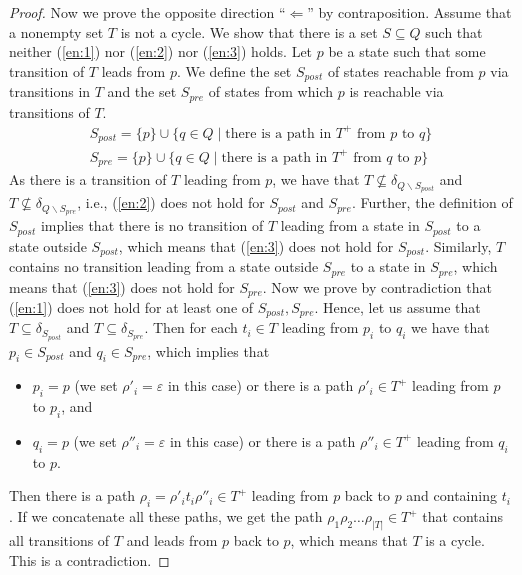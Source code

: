 \documentclass[a4paper,UKenglish,cleveref,autoref,thm-restate]{lipics-v2021}
\newcommand{\pre}{{S_\mathit{pre}}}
\newcommand{\post}{{S_\mathit{post}}}
\begin{document}
\begin{proof}
  Now we prove the opposite direction ``$\Longleftarrow$'' by
  contraposition. Assume that a nonempty set $T$ is not a cycle. We
  show that there is a set $S\subseteq Q$ such that neither
  (\ref{en:1}) nor (\ref{en:2}) nor (\ref{en:3}) holds. Let $p$ be a
  state such that some transition of $T$ leads from $p$. We define the
  set $\post$ of states reachable from $p$ via transitions in $T$ and the set
  $\pre$ of states from which $p$ is reachable via transitions of $T$.
  \[
    \begin{array}{r}
    \post=\{p\}\cup\{q\in Q\mid \textrm{there is a path in }T^+\textrm{ from }p\textrm{ to }q\}\\[.5ex]
    \pre=\{p\}\cup\{q\in Q\mid \textrm{there is a path in }T^+\textrm{ from }q\textrm{ to }p\}
    \end{array}
  \]  
  As there is a transition of $T$ leading from $p$, we have that
  $T\not\subseteq\delta_{Q\smallsetminus\post}$ and
  $T\not\subseteq\delta_{Q\smallsetminus\pre}$, i.e., (\ref{en:2})
  does not hold for $\post$ and $\pre$. Further, the definition of
  $\post$ implies that there is no transition of $T$ leading from a
  state in $\post$ to a state outside $\post$, which means that
  (\ref{en:3}) does not hold for $\post$. Similarly, $T$ contains no
  transition leading from a state outside $\pre$ to a state in $\pre$,
  which means that (\ref{en:3}) does not hold for $\pre$. Now we prove
  by contradiction that (\ref{en:1}) does not hold for at least one of
  $\post,\pre$. Hence, let us assume that $T\subseteq\delta_\post$ and
  $T\subseteq\delta_\pre$. Then for each $t_i\in T$ leading from $p_i$
  to $q_i$ we have that $p_i\in\post$ and $q_i\in\pre$, which implies
  that
  \begin{itemize}
  \item $p_i=p$ (we set $\rho'_i=\varepsilon$ in this case) or
    there is a path $\rho'_i\in T^+$ leading from $p$ to $p_i$, and
  \item $q_i=p$ (we set $\rho''_i=\varepsilon$ in this case) or
    there is a path $\rho''_i\in T^+$ leading from $q_i$ to $p$.
  \end{itemize}
  Then there is a path $\rho_i=\rho'_it_i\rho''_i\in T^+$ leading from
  $p$ back to $p$ and containing $t_i$. If we concatenate all these
  paths, we get the path $\rho_1\rho_2\ldots\rho_{|T|}\in T^+$ that
  contains all transitions of $T$ and leads from $p$ back to $p$,
  which means that $T$ is a cycle.  This is a contradiction.%
\end{proof}
\end{document}
